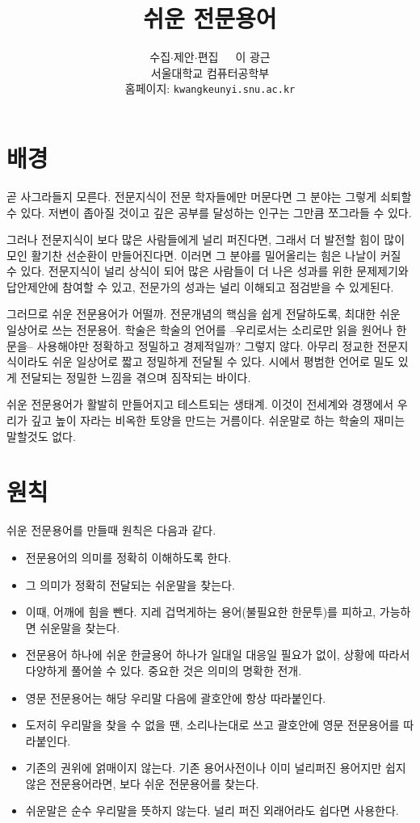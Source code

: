 \documentclass[11pt]{article}
\title{쉬운 전문용어}
\author{수집\(\cdot\)제안\(\cdot\)편집\ \ \  이 광근\\
  서울대학교 컴퓨터공학부\\
  홈페이지: \texttt{kwangkeunyi.snu.ac.kr}
}
\date{}
\begin{document}
\maketitle

\section*{배경}
곧 사그라들지 모른다. 전문지식이 전문 학자들에만 머문다면 그 분야는
그렇게 쇠퇴할 수 있다. 저변이 좁아질 것이고 깊은 공부를 달성하는 인구는
그만큼 쪼그라들 수 있다. 

그러나 전문지식이 보다 많은 사람들에게 널리 퍼진다면, 그래서 더 발전할
힘이 많이 모인 활기찬 선순환이 만들어진다면. 이러면 그 분야를
밀어올리는 힘은 나날이 커질 수 있다. 전문지식이 널리 상식이 되어 
많은 사람들이 더 나은 성과를 위한 문제제기와 답안제안에 참여할 수
있고, 전문가의 성과는 널리 이해되고 점검받을 수 있게된다. 

그러므로 쉬운 전문용어가 어떨까. 전문개념의 핵심을 쉽게 전달하도록,
최대한 쉬운 일상어로 쓰는 전문용어. 학술은 학술의 언어를
--우리로서는 소리로만 읽을 원어나 한문을-- 사용해야만 정확하고
정밀하고 경제적일까? 그렇지 않다. 아무리 정교한 전문지식이라도 쉬운
일상어로 짧고 정밀하게 전달될 수 있다. 시에서 평범한 언어로 밀도 있게
전달되는 정밀한 느낌을 겪으며 짐작되는 바이다.

쉬운 전문용어가 활발히 만들어지고 테스트되는 생태계. 
이것이 전세계와 경쟁에서 우리가 깊고 높이 자라는 비옥한
토양을 만드는 거름이다. 쉬운말로 하는 학술의 재미는
말할것도 없다. 

\section*{원칙}
쉬운 전문용어를 만들때 원칙은 다음과 같다.
\begin{itemize}
\item 전문용어의 의미를 정확히 이해하도록 한다.
\item 그 의미가 정확히 전달되는 쉬운말을 찾는다.
\item 이때, 어깨에 힘을 뺀다. 지레 겁먹게하는 용어(불필요한 한문투)를
  피하고, 가능하면 쉬운말을 찾는다. 
\item 전문용어 하나에 쉬운 한글용어 하나가 일대일 대응일 필요가 없이,
  상황에 따라서 다양하게 풀어쓸 수 있다. 중요한 것은 의미의 명확한
  전개.
\item 영문 전문용어는 해당 우리말 다음에 괄호안에 항상 따라붙인다.
\item 도저히 우리말을 찾을 수 없을 땐, 소리나는대로 쓰고 괄호안에 영문
  전문용어를 따라붙인다. 
\item 기존의 권위에 얽매이지 않는다. 기존 용어사전이나 이미 널리퍼진
  용어지만 쉽지않은 전문용어라면, 보다 쉬운 전문용어를 찾는다.
\item 쉬운말은 순수 우리말을 뜻하지 않는다. 널리 퍼진 외래어라도
  쉽다면 사용한다. 
\end{itemize}



\printindex
\end{document}
